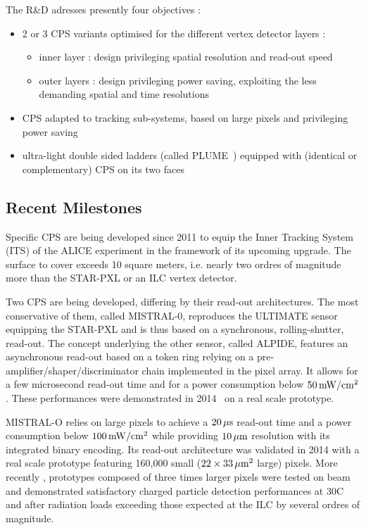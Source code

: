 The R\&D adresses presently four objectives :
\begin{itemize}
\item 2 or 3 CPS variants optimised for the different vertex detector layers :
\begin{itemize}
\item inner layer : design privileging spatial resolution and read-out speed
\item outer layers : design privileging power saving, exploiting the
				less demanding spatial and time resolutions
\end{itemize}
\item CPS adapted to tracking sub-systems, based on large pixels and privileging
power saving
\item ultra-light double sided ladders (called PLUME~\cite{Nomerotski2011208})
equipped with (identical or complementary) CPS on its two faces
\end{itemize}


\subsection{Recent Milestones}
Specific CPS are being developed since 2011 to equip the Inner Tracking
System (ITS) of the ALICE experiment in the framework of its upcoming
upgrade. The surface to cover exceeds 10 square meters, i.e. nearly two
ordres of magnitude more than the STAR-PXL or an ILC vertex detector.

Two CPS are being developed, differing by their read-out architectures.
The most conservative of them, called MISTRAL-0, reproduces the ULTIMATE
sensor equipping the STAR-PXL and is thus based on a synchronous, rolling-shutter, read-out. The concept underlying the other sensor, called ALPIDE, features an asynchronous read-out based on a token ring relying on a pre-amplifier/shaper/discriminator chain implemented in the pixel array. It
allows for a few microsecond read-out time and for a power consumption below
$\unit[50]{mW/cm^2}$. These performances were demonstrated in 2014~\cite{1748-0221-10-03-C03030}
on a real scale prototype.

MISTRAL-O relies on large pixels to achieve a $\unit[20]{\mu s}$ read-out
time and a power consumption below $\unit[100]{mW/cm^2}$ while providing
$\unit[10]{\mu m}$ resolution with its integrated binary encoding.
Its read-out architecture was validated in 2014 with a real scale
prototype \cite{ref:cps6} featuring 160,000 small ($22\times\unit[33]{\mu m^2}$
large) pixels. More recently \cite{Winter:ALCW15}, prototypes composed of
three times larger pixels were tested on beam and demonstrated satisfactory
charged particle detection performances at
30\textdegree C and after radiation loads exceeding those expected at the
ILC by several ordres of magnitude.

